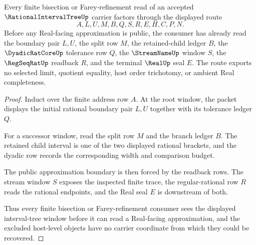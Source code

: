 \begin{theorem}
\label{thm:rational-interval-tree-bisection-window}
Every finite bisection or Farey-refinement read of an accepted $\RationalIntervalTreeUp$ carrier factors through the displayed route
$$
A,L,U,M,B,Q,S,R,E,H,C,P,N .
$$
Before any Real-facing approximation is public, the consumer has already read the boundary pair $L,U$, the split row $M$, the retained-child ledger $B$, the $\DyadicRatCoreUp$ tolerance row $Q$, the $\StreamNameUp$ window $S$, the $\RegSeqRatUp$ readback $R$, and the terminal $\RealUp$ seal $E$. The route exports no selected limit, quotient equality, host order trichotomy, or ambient Real completeness.
\end{theorem}
\begin{proof}
Induct over the finite address row $A$. At the root window, the packet displays the initial rational boundary pair $L,U$ together with its tolerance ledger $Q$.

For a successor window, read the split row $M$ and the branch ledger $B$. The retained child interval is one of the two displayed rational brackets, and the dyadic row records the corresponding width and comparison budget.

The public approximation boundary is then forced by the readback rows. The stream window $S$ exposes the inspected finite trace, the regular-rational row $R$ reads the rational endpoints, and the Real seal $E$ is downstream of both.

Thus every finite bisection or Farey-refinement consumer sees the displayed interval-tree window before it can read a Real-facing approximation, and the excluded host-level objects have no carrier coordinate from which they could be recovered.
\end{proof}



